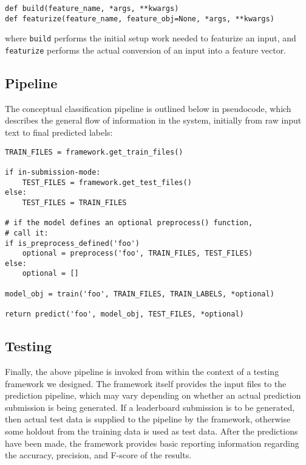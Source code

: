 \documentclass[
10pt, %
a4paper, %
oneside, %
headinclude,footinclude, %
BCOR5mm, %
]{scrartcl}
\begin{document}
\begin{Verbatim}[frame=single]
def build(feature_name, *args, **kwargs)
def featurize(feature_name, feature_obj=None, *args, **kwargs)
\end{Verbatim}

\noindent where \texttt{build} performs the initial setup work needed to
featurize an input, and \texttt{featurize} performs the actual conversion of an
input into a feature vector.

\break
\subsection{Pipeline}

The conceptual classification pipeline is outlined below in pseudocode, which
describes the general flow of information in the system, initially from raw
input text to final predicted labels:

\begin{Verbatim}[frame=single]
TRAIN_FILES = framework.get_train_files()

if in-submission-mode:
    TEST_FILES = framework.get_test_files()
else:
    TEST_FILES = TRAIN_FILES

# if the model defines an optional preprocess() function, 
# call it:
if is_preprocess_defined('foo')
    optional = preprocess('foo', TRAIN_FILES, TEST_FILES)
else:
    optional = []

model_obj = train('foo', TRAIN_FILES, TRAIN_LABELS, *optional)

return predict('foo', model_obj, TEST_FILES, *optional)
\end{Verbatim}

\subsection{Testing}

Finally, the above pipeline is invoked from within the context of a testing
framework we designed. The framework itself provides the input files to the 
prediction pipeline, which may vary depending on whether an actual prediction
submission is being generated. If a leaderboard submission is to be generated, 
then actual test data is supplied to the pipeline by the framework, otherwise 
some holdout from the training data is used as test data. After the predictions 
have been made, the framework provides basic reporting information regarding 
the accuracy, precision, and F-score of the results.
\end{document}
